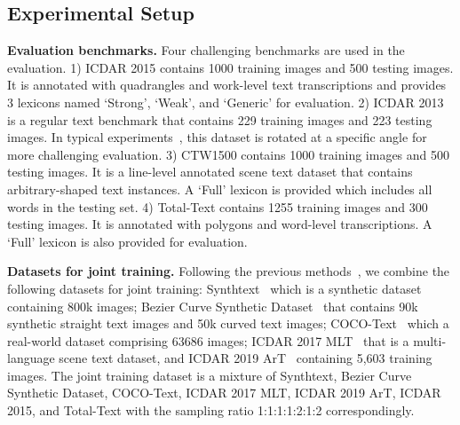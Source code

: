  \subsection{Experimental Setup}


\smallskip\noindent\textbf{Evaluation benchmarks.}
Four challenging benchmarks are used in the evaluation. 1) ICDAR 2015 contains 1000 training images and 500 testing images. It is annotated with quadrangles and work-level text transcriptions and provides 3 lexicons named ‘Strong’, ‘Weak’, and ‘Generic’ for evaluation. 
2) ICDAR 2013 is a regular text benchmark that contains 229 training images and 223 testing images. In typical experiments~\cite{liao2020mask, huang2022swintextspotter,kittenplon2022towards}, this dataset is rotated at a specific angle for more challenging evaluation.
3) CTW1500 contains 1000 training images and 500 testing images. It is a line-level annotated scene text dataset that contains arbitrary-shaped text instances. A `Full' lexicon is provided which includes all words in the testing set. 
4) Total-Text contains 1255 training images and 300 testing images. It is annotated with polygons and word-level transcriptions. A `Full' lexicon is also provided for evaluation.


\smallskip\noindent\textbf{Datasets for joint training.}
Following the previous methods~\cite{qiao2020mango,liu2021abcnet, zhang2022text,wu2022decoupling}, we combine the following datasets for joint training: Synthtext~\cite{gupta2016synthetic} which is a synthetic dataset containing 800k images; Bezier Curve Synthetic Dataset~\cite{liu2020abcnet} that contains 90k synthetic straight text images and 50k curved text images; COCO-Text~\cite{veit2016coco} which a real-world dataset comprising 63686 images; ICDAR 2017 MLT~\cite{nayef2017icdar2017} that is a multi-language scene text dataset, and ICDAR 2019 ArT~\cite{chng2019icdar2019} containing 5,603 training images. The joint training dataset is a mixture of Synthtext, Bezier Curve Synthetic Dataset, COCO-Text, ICDAR 2017 MLT, ICDAR 2019 ArT, ICDAR 2015, and Total-Text with the sampling ratio 1:1:1:1:2:1:2 correspondingly.


